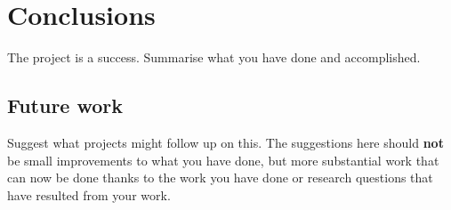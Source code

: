 \chapter{Conclusions}
\label{ch:conclusions}



The project is a success. Summarise what you have done and accomplished.

\section{Future work}

Suggest what projects might follow up on this. The suggestions here should \textbf{not} be small improvements to what you have done, but more substantial work that can now be done thanks to the work you have done or research questions that have resulted from your work.